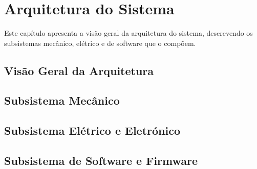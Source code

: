 

\chapter{Arquitetura do Sistema}
\label{chapter:architecture}

\begin{introduction}
Este capítulo apresenta a visão geral da arquitetura do sistema, descrevendo os subsistemas mecânico, elétrico e de software que o compõem.
\end{introduction}



\section{Visão Geral da Arquitetura}
\label{sec:visao-geral}


\section{Subsistema Mecânico}
\label{sec:subsistema-mecanico}


\section{Subsistema Elétrico e Eletrónico}
\label{sec:subsistema-eletrico}


\section{Subsistema de Software e Firmware}
\label{sec:subsistema-software}

